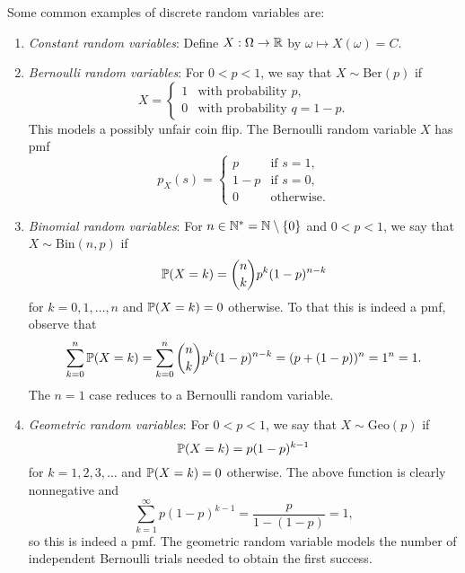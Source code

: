 \begin{example}
  Some common examples of discrete random variables
  are:
  \begin{enumerate}
    \item \emph{Constant random variables}:
      Define $X : \Omega \to \mathbb{R}$ by
      $\omega \mapsto X(\omega) = C$.
    \item \emph{Bernoulli random variables}:
      For $0 < p < 1$, we say that
      $X \sim \mathrm{Ber}(p)$ if
      \[
        X =
        \begin{cases}
          1 & \text{with probability } p, \\
          0 & \text{with probability } q = 1 - p.
        \end{cases}
      \]
      This models a possibly unfair
      coin flip. The Bernoulli random variable $X$
      has pmf
      \[
        p_X(s) =
        \begin{cases}
          p & \text{if } s = 1, \\
          1 - p & \text{if } s = 0, \\
          0 & \text{otherwise}.
        \end{cases}
      \]
    \item \emph{Binomial random variables}:
      For $n \in \mathbb{N}^* = \mathbb{N} \setminus \{0\}$ and $0 < p < 1$, we say that
      $X \sim \mathrm{Bin}(n, p)$ if
      \[
        \mathbb{P}(X = k) = \binom{n}{k} p^k (1 - p)^{n - k}
      \]
      for $k = 0, 1, \dots, n$ and $\mathbb{P}(X = k) = 0$
      otherwise. To that this is indeed a pmf,
      observe that
      \[
        \sum_{k = 0}^n \mathbb{P}(X = k) = \sum_{k = 0}^n \binom{n}{k} p^k (1 - p)^{n - k} = (p + (1 - p))^n = 1^n = 1.
      \]
      The $n = 1$ case reduces to a Bernoulli
      random variable.
    \item \emph{Geometric random variables}:
      For $0 < p < 1$, we say that
      $X \sim \mathrm{Geo}(p)$ if
      \[
        \mathbb{P}(X = k) = p(1 - p)^{k - 1}
      \]
      for $k = 1, 2, 3, \dots$ and
      $\mathbb{P}(X = k) = 0$ otherwise. The above function
      is clearly nonnegative and
      \[
        \sum_{k = 1}^\infty p(1 - p)^{k - 1}
        = \frac{p}{1 - (1 - p)} = 1,
      \]
      so this is indeed a pmf. The geometric
      random variable models the
      number of independent Bernoulli trials needed
      to obtain the first success.
  \end{enumerate}
\end{example}

